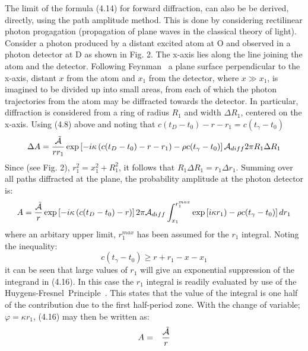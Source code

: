 \documentclass [12pt]{article}
\begin{document}
{  \par The limit of the formula (4.14) for forward diffraction, can also be be derived,
    directly, using the path amplitude
    method. This is done by
  considering rectilinear photon progagation (propagation
   of plane waves in the classical theory of light). Consider a photon produced by a distant
   excited atom at O and observed in a photon detector at D as shown in Fig. 2. The x-axis lies along the line 
   joining the atom and the detector. Following Feynman~\cite{Feyn9} a plane surface perpendicular
   to the x-axis, distant $x$ from the atom and $x_1$ from the detector, where $x \gg x_1$, is 
   imagined to be divided up into small areas, from each of which the photon trajectories
    from the atom may be diffracted towards the detector. In particular, diffraction is considered
    from a ring of radius $R_1$ and width $\Delta R_1$, centered on the x-axis. Using (4.8) above
    and noting that $c(t_D-t_0)-r-r_1 = c(t_{\gamma}-t_0)$
   \begin{equation}
  \Delta A = \frac{\tilde{{\cal A}}}{r r_1}
   \exp \left[ - i \kappa \left(c(t_D-t_0)-r-r_1 \right)-\rho c(t_{\gamma}-t_0)\right]
  {\cal A}_{diff} 2 \pi R_1 \Delta R_1
 \end{equation} 
   Since (see Fig. 2), $r_1^2 = x_1^2+R_1^2$, it follows that $R_1 \Delta R_1 = r_1  \Delta r_1$.
   Summing over
   all paths diffracted at the plane, the probability amplitude at the photon detector is:
    \begin{equation}
  A =  \frac{\tilde{{\cal A}}}{r}
   \exp\left[ -i \kappa\left( c(t_D-t_0)- r\right)\right] 2 \pi {\cal A}_{diff}
   \int_{x_1}^{r_1^{max}} \exp\left[ i\kappa r_1)-\rho c (t_{\gamma}-t_0) \right]dr_1 
 \end{equation} 
   where an arbitary upper limit, $r_1^{max}$ has been assumed for the $r_1$ integral. 
   Noting the inequality:
     \begin{equation}
       c (t_{\gamma}-t_0) \ge r+r_1- x -x_1
   \end{equation} 
    it can be seen that large values of $r_1$  will give an exponential 
     suppression of the integrand in (4.16). In this case the $r_1$ integral is readily evaluated
 by use of the Huygens-Fresnel\ Principle~\cite{BW1}. This states that the value of the 
  integral is one half of the contribution due to the first half-period zone. With the change
   of variable; $\varphi = \kappa r_1$, (4.16) may then be written as:
 \begin{eqnarray}
A  & = & \frac{\tilde{{\cal A}}}{r}

\end{eqnarray}}
\end{document}
